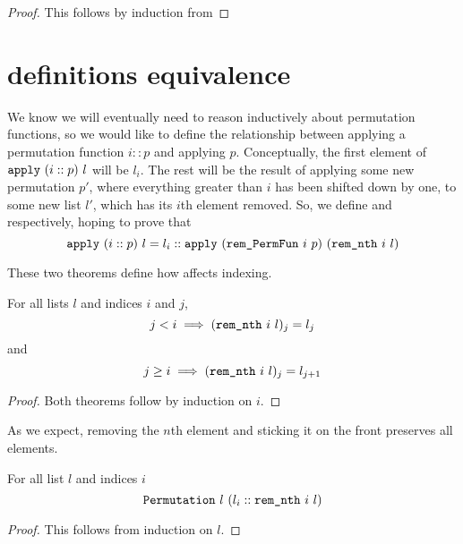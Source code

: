 \documentclass[sigplan,10pt,anonymous,review]{thesis}
\begin{document}
\hdsortsortedS
\begin{proof}
  This follows by induction from 
\end{proof}

\section{ definitions equivalence}
\label{appendix:perm_def_eq}

We know we will eventually need to reason inductively about
permutation functions, so we would like to define the relationship
between applying a permutation function $i :: p$ and applying $p$.
Conceptually, the first element of $\texttt{apply}~(i::p)~l$ will be
$l_i$. The rest will be the result of applying some new permutation
$p'$, where everything greater than $i$ has been shifted down by one,
to some new list $l'$, which has its $i$th element removed. So, we
define  and  respectively, hoping to
prove that
\begin{equation*}
  \texttt{apply}~(i::p)~l =
  l_i :: \texttt{apply}~(\texttt{rem\_PermFun}~i~p)~(\texttt{rem\_nth}~i~l)
\end{equation*}

\vspace{\parskip}


These two theorems define how  affects indexing.
\begin{theorem}
  For all lists $l$ and indices $i$ and $j$,
  \begin{equation*}
    j < i \implies (\texttt{rem\_nth}~i~l)_j = l_j
  \end{equation*}
  and
  \begin{equation*}
    j \ge i \implies (\texttt{rem\_nth}~i~l)_j = l_{j+1}
  \end{equation*}
\end{theorem}
\begin{proof}
  Both theorems follow by induction on $i$.
\end{proof}

As we expect, removing the $n$th element and sticking it on the front
preserves all elements.
\begin{theorem}
  For all list $l$ and indices $i$
  \begin{equation*}
    \texttt{Permutation}~l~(l_i :: \texttt{rem\_nth}~i~l)
  \end{equation*}
\end{theorem}
\begin{proof}
  This follows from induction on $l$.
\end{proof}
\end{document}

